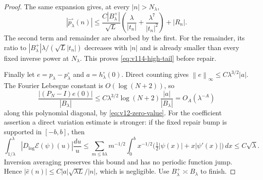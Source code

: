 \documentclass[11pt]{article}
\theoremstyle{remark}
\newcommand{\norm}[1]{\left\lVert #1\right\rVert}
\begin{document}
\begin{proof}
The same expansion gives, at every $|n|>N_\lambda$,
\[
 |\widehat p_\lambda^\circ(n)|
 \le \frac{C|B_\lambda^+|}{\sqrt L}
       \left(\frac\lambda{|t_n|}+\frac{\lambda^7}{|t_n|^2}\right)
       +|R_n|.
\]
The second term and remainder are absorbed by the first. For the remainder,
its ratio to $|B_\lambda^+|\lambda/(\sqrt L|t_n|)$ decreases with $|n|$
and is already smaller than every fixed inverse power at $N_\lambda$.
This proves \eqref{eq:v114-high-tail} before repair.

Finally let $e=p_\lambda-p_\lambda^\circ$ and
$a=h_\lambda^\circ(0)$. Direct counting gives
$\norm e_\infty\le C\lambda^{3/2}|a|$.
The Fourier Lebesgue constant is $O(\log(N+2))$, so
\[
 \frac{|(P_N-I)e(0)|}{|B_\lambda|}
 \le C\lambda^{3/2}\log(N+2)\frac{|a|}{|B_\lambda|}
       =O_A(\lambda^{-A})
\]
along this polynomial diagonal, by \eqref{eq:v12-zero-value}.
For the coefficient assertion a direct variation estimate is stronger:
if the fixed repair bump is supported in $[-b,b]$, then
\[
 \int_{1/\lambda}^{\lambda}|D_{\log}\mathcal E(\psi)(u)|\frac{du}{u}
 \le \sum_{m\le b\lambda}m^{-1/2}
   \int_0^b x^{-1/2}\bigl(\tfrac12|\psi(x)|+x|\psi'(x)|\bigr)\,dx
 \le C\sqrt\lambda.
\]
Inversion averaging preserves this bound and has no periodic function
jump. Hence $|\widehat e(n)|\le C|a|\sqrt{\lambda L}/|n|$, which is
negligible. Use $B_\lambda^+\asymp B_\lambda$ to finish.
\end{proof}
\end{document}
